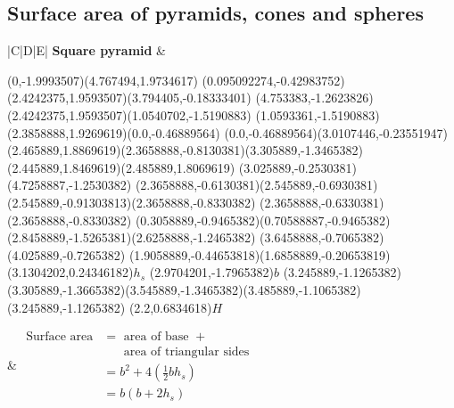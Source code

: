 \subsection{Surface area of pyramids, cones and spheres}

\begin{table}[H]
\begin{tabular}{|C|D|E|}
\hline
\textbf{Square pyramid}
&
\begin{center}

\scalebox{0.7} %
{
\begin{pspicture}(0,-1.9993507)(4.767494,1.9734617)
\pspolygon[linewidth=0.028222222,fillstyle=solid](0.095092274,-0.42983752)(2.4242375,1.9593507)(3.794405,-0.18333401)
\pspolygon[linewidth=0.028222222,fillstyle=solid](4.753383,-1.2623826)(2.4242375,1.9593507)(1.0540702,-1.5190883)
\pspolygon[linewidth=0.028222222,fillstyle=solid](1.0593361,-1.5190883)(2.3858888,1.9269619)(0.0,-0.46889564)
\psline[linewidth=0.022cm,linestyle=dashed,dash=0.16cm 0.16cm](0.0,-0.46889564)(3.0107446,-0.23551947)
\psline[linewidth=0.027999999,linestyle=dotted,dotsep=0.16cm](2.465889,1.8869619)(2.3658888,-0.8130381)(3.305889,-1.3465382)(2.445889,1.8469619)(2.485889,1.8069619)
\psline[linewidth=0.024cm,linestyle=dashed,dash=0.16cm 0.16cm](3.025889,-0.2530381)(4.7258887,-1.2530382)
\psline[linewidth=0.02](2.3658888,-0.6130381)(2.545889,-0.6930381)(2.545889,-0.91303813)(2.3658888,-0.8330382)
\psline[linewidth=0.02cm](2.3658888,-0.6330381)(2.3658888,-0.8330382)
\psline[linewidth=0.04cm](0.3058889,-0.9465382)(0.70588887,-0.9465382)
\psline[linewidth=0.04cm](2.8458889,-1.5265381)(2.6258888,-1.2465382)
\psline[linewidth=0.04cm](3.6458888,-0.7065382)(4.025889,-0.7265382)
\psline[linewidth=0.04cm](1.9058889,-0.44653818)(1.6858889,-0.20653819)
\rput(3.1304202,0.24346182){$h_s$}
\rput(2.9704201,-1.7965382){$b$}
\psline[linewidth=0.02](3.245889,-1.1265382)(3.305889,-1.3665382)(3.545889,-1.3465382)(3.485889,-1.1065382)(3.245889,-1.1265382)
\rput(2.2,0.6834618){$H$}
\end{pspicture} 
}
\end{center} 
&
$\begin{aligned}
\mbox{Surface area} &= \mbox{ area of base } +\\
&~~~~~~\mbox{ area of triangular sides } \\
&=b^{2} + 4\left(\frac{1}{2}bh_s\right)\\
&=b(b+2h_s)
 \end{aligned}$
\\ \hline


\end{tabular}
\end{table}
